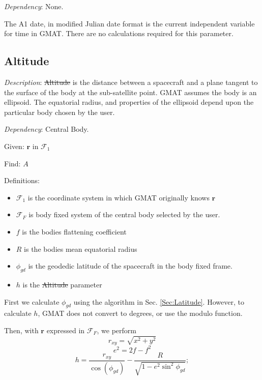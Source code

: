 \noindent \textit{Dependency}:  None.

The A1 date, in modified Julian date format is the current
independent variable for time in GMAT.  There are no calculations
required for this parameter.

\subsection{Altitude} 

\noindent \textit{Description}: \st{Altitude} is the distance
between a spacecraft and a plane tangent to the surface of the body
at the sub-satellite point.  GMAT assumes the body is an ellipsoid.
The equatorial radius, and properties of the ellipsoid depend upon
the particular body chosen by the user.

\noindent \textit{Dependency}:  Central Body.

\noindent Given:  $\mathbf{r}$ in $\mathcal{F}_1$

\noindent Find:  $A$

\noindent Definitions:
\begin{itemize}
     \item $\mathcal{F}_1$ is the coordinate system in which GMAT originally knows $\mathbf{r}$
     \item $\mathcal{F}_F$ is body fixed system of the central body selected by the user.
     \item $f$ is the bodies flattening coefficient
     \item $R$ is the bodies mean equatorial radius
     \item $\phi_{gd}$ is the geodedic latitude of the spacecraft
     in the body fixed frame.
     \item $h$ is the \st{Altitude} parameter
\end{itemize}

First we calculate $\phi_{gd}$ using the algorithm in Sec.
\ref{Sec:Latitude}.  However, to calculate $h$, GMAT does not
convert to degrees, or use the modulo function.

Then, with $\mathbf{r}$ expressed in $\mathcal{F}_F$, we perform
%
\begin{equation}
     r_{xy} = \sqrt{ x^2 + y^2 }
\end{equation}
%
\begin{equation}
    e^2 = 2f-f^2
\end{equation}
%
\begin{equation}
            h =   \frac{ r_{xy}}{ \cos(\phi_{gd})} - \frac{R} { \sqrt{ 1 - e^2  \sin^{2}{ \phi_{gd} } } };
\end{equation}

